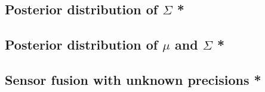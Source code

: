 \subsection{Posterior distribution of $\Sigma$ *}



\subsection{Posterior distribution of $\mu$ and $\Sigma$ *}
\label{sec:Posterior-distribution-of-mu-and-Sigma}


\subsection{Sensor fusion with unknown precisions *}

